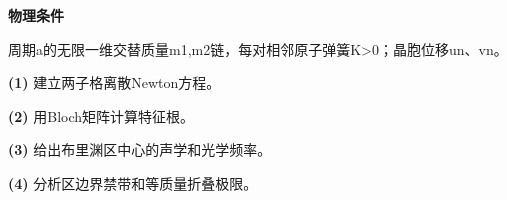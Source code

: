 \textbf{物理条件}\par 周期a的无限一维交替质量m1,m2链，每对相邻原子弹簧K>0；晶胞位移un、vn。
\par\noindent\textbf{(1)} 建立两子格离散Newton方程。
\par\noindent\textbf{(2)} 用Bloch矩阵计算特征根。
\par\noindent\textbf{(3)} 给出布里渊区中心的声学和光学频率。
\par\noindent\textbf{(4)} 分析区边界禁带和等质量折叠极限。
